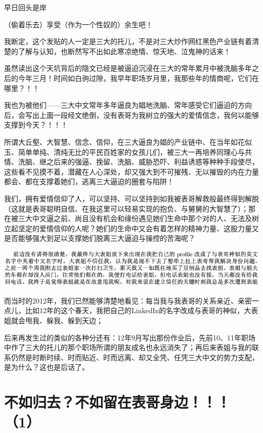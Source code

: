 \documentclass[9pt, b5paper]{article}
\begin{document}
早日回头是岸

（偷着乐去）享受（作为一个性奴的）余生吧！

我断定，这个发贴的人一定是三大的托儿，不是对三大炒作网红黑色产业链有着清楚的了解与认知，也断然写不出如此寒凉绝情、惊天地、泣鬼神的话来！

虽然读出这个天坑背后的隐文已经是被逼迫沉浸在三大的常年累月中被洗脑多年之后的今年三月！时间如白驹过隙，我早年职场岁月里，我那些年的情商呢，它们在哪里？！！

我也为被他们——三大中文常年多年逼良为娼地洗脑、常年感受它们逼迫的方向后，会写出上面一段经文绝倒，没有表哥为我树立的强大的爱情信念，我何以能够支撑到今天？！！！

所谓大丘壑、大智慧、信念、信仰，在三大逼良为娼的产业链中、在当年如花似玉、简单单纯、清纯无比的平民百姓家的女孩儿们，被三大一再培养同理心与共情、洗脑、继之后来的强逼、挽留、洗脑、威胁恐吓、利益诱惑等种种手段使尽，这些看不见摸不着，潜藏在人心深处，却又强大到不可摧残、无以摧毁的内在力量都会、都在支撑着她们，逃离三大逼迫的圈套与陷阱！

我们，拥有爱情信仰了人，可以坚持、可以坚持到如我被表哥解救般最终得到解脱（这就是表哥聪明自信、在我这里可以轻易实现的抱负、与舅舅的大智慧了）；那在被三大中文逼之前、尚且没有机会和缘份遇见她们生命中那个对的人、无法及树立起坚定的爱情信仰的人呢？她们的生命中又会有着怎样的精神力量、这股力量又是否能够强大到足以支撑她们脱离三大逼迫与操控的苦海呢？

\begin{center}
\includegraphics[width=.9\linewidth]{./pic/backups_plans_20210413_135837.png}
\end{center}

而当时的2012年，我们已然能够清楚地看见：每当我与我表哥的关系亲近、亲密一点儿，比如12年的这个春天，我把自己的LinkedIn的名字改成与表哥的神似，大表姐就会甩我、躲我、躲到天边；

后来再发生过的类似的各种分还有：12年9月写出那份作业后，先前10、11年职场中作了三大的托儿的那个职场所谓的朋友成名也永远消失了；再后来表姐与我的联系仍然是时断时续、时而贴近、时而远离、却又全凭、任凭三大中文的势力支配，是为什么？这也是后话了。 

\section{不如归去？不如留在表哥身边！！！（1）}
\label{sec:orgb9eac7c}
\end{document}
